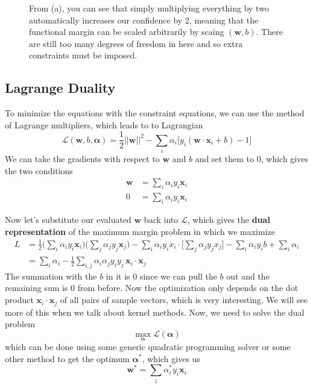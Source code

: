 \documentclass{article}
\theoremstyle{definition}
\theoremstyle{remark}
\theoremstyle{definition}
\begin{document}
\begin{figure}[hbt!]
    \caption{From (a), you can see that simply multiplying everything by two automatically increases our confidence by $2$, meaning that the functional margin can be scaled arbitrarily by scaing $(\mathbf{w}, b)$. There are still too many degrees of freedom in here and so extra constraints must be imposed. } 
    \label{fig:scaling_problem} 
\end{figure}


\subsection{Lagrange Duality} 

To minimize the equations with the constraint equations, we can use the method of Lagrange multipliers, which leads to to Lagrangian 
\[\mathcal{L}(\mathbf{w}, b, \boldsymbol{\alpha}) = \frac{1}{2} ||\mathbf{w}||^2 - \sum_i \alpha_i \big[ y_i (\mathbf{w} \cdot \mathbf{x}_i + b) - 1\big]\]
We can take the gradients with respect to $\mathbf{w}$ and $b$ and set them to $0$, which gives the two conditions 
\begin{align*} 
  \mathbf{w} & = \sum_i \alpha_i y_i \mathbf{x}_i \\
  0 & = \sum_i \alpha_i y_i \mathbf{x}_i 
\end{align*}

Now let's substitute our evaluated $\mathbf{w}$ back into $\mathcal{L}$, which gives the \textbf{dual representation} of the maximum margin problem in which we maximize  
\begin{align*} 
    L & = \frac{1}{2} \bigg( \sum_i \alpha_i y_i \mathbf{x}_i \bigg) \bigg( \sum_j \alpha_j y_j \mathbf{x}_j \bigg) - \sum_{i} \alpha_i y_i x_i \cdot \bigg[ \sum_j \alpha_j y_j x_j \bigg] - \sum_i \alpha_i y_i b + \sum_i \alpha_i \\ 
      & = \sum_i \alpha_i - \frac{1}{2} \sum_{i, j} \alpha_i \alpha_j y_i y_j \, \mathbf{x}_i \cdot \mathbf{x}_j 
\end{align*}
The summation with the $b$ in it is $0$ since we can pull the $b$ out and the remaining sum is $0$ from before. Now the optimization only depends on the dot product $\mathbf{x}_i \cdot \mathbf{x}_j$ of all pairs of sample vectors, which is very interesting. We will see more of this when we talk about kernel methods. Now, we need to solve the dual problem 
\[\max_{\boldsymbol{\alpha}} \mathcal{L}(\boldsymbol{\alpha})\]
which can be done using some generic quadratic programming solver or some other method to get the optimum $\boldsymbol{\alpha}^\ast$, which gives us 
\[\mathbf{w}^\ast = \sum_i \alpha_i^\ast y_i \mathbf{x}_i\]
\end{document}
